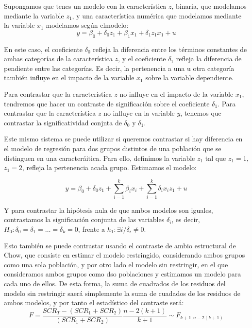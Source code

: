 
Supongamos que tenes un modelo con la caracter\'istica $z$, binaria, que modelamos mediante la variable $z_1$, y una caracter\'istica num\'erica que modelamos mediante la variable $x_1$  modelamos seg\'un elmodelo:
\[y=\beta_0+\delta_0z_1+\beta_1x_1+\delta_1z_1x_1+u\]

En este caso, el coeficiente $\delta_0$ refleja la diferencia entre los t\'erminos constantes de ambas categor\'ias de la caracter\'istica $z$, y el coeficiente $\delta_1$ refleja la diferencia de pendiente entre las categor\'ias. Es decir, la pertenencia a una u otra categor\'ia tambi\'en influye en el impacto de la variable $x_1$ sobre la variable dependiente.

Para contrastar que la caracter\'istica $z$ no influye en el impacto de la variable $x_1$, tendremos que hacer un contraste de significaci\'on sobre el coeficiente $\delta_1$. Para contrastar que la caracter\'istica $z$ no influye en la variable $y$, tenemos que contrastar la significatividad conjnta de $\delta_0$ y $\delta_1$.

Este mismo sistema se puede utilizar si queremos contrastar si hay diferencia en el modelo de regresi\'on para dos grupos distintos de una poblaci\'on que se distinguen en una caracter\'aitica. Para ello, definimos la variable $z_1$ tal que $z_1=1$, $z_1=2$, refleja la pertenencia  acada grupo. Estimamos el modelo:

\[y=\beta_0 + \delta_0z_1+\sum_{i=1}^k\beta_ix_i+\sum_{i=1}^k\delta_ix_iz_1+u\]

Y para contrastar la hip\'otesis nula de que ambos modelos son iguales, contrastamos la significaci\'on conjunta de las variables $\delta_i$, es decir, $H_0:\delta_0=\delta_1=\ldots=\delta_k=0$, frente a $h_1:\exists i/\delta_i\neq 0$.

Esto tambi\'en se puede contrastar usando el contraste de ambio estructural de Chow, que consiste en estimar el modelo restringido, considerando ambos grupos como una sola poblaci\'on, y por otro lado el modelo sin restringir, en el que consideramos ambos grupos como dso poblaciones y estimamos un modelo para cada uno de ellos. De esta forma, la suma de cuadrados de los residuos del modelo sin restringir saer\'a simplemente la suma de cuadados de los residuos de ambos modelos, y por tanto el estad\'istico del contraste ser\'a:
\[F=\dfrac{SCR_T-(SCR_1+SCR_2)}{(SCR_1+SCR_2)}\dfrac{n-2(k+1)}{k+1}\sim F_{k+1,n-2(k+1)}\]

